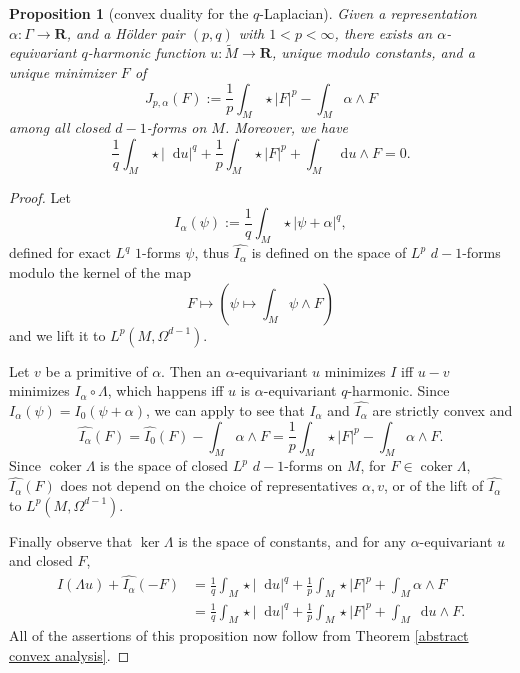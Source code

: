 \documentclass[reqno,11pt]{amsart}
\newcommand{\RR}{\mathbf{R}}
\newcommand*\dif{\mathop{}\!\mathrm{d}}
\DeclareMathOperator{\coker}{coker}
\newtheorem{proposition}[theorem]{Proposition}
\theoremstyle{definition}
\numberwithin{equation}{section}
\begin{document}
\begin{proposition}[convex duality for the $q$-Laplacian]\label{mfmc qLaplacian}
Given a representation $\alpha: \Gamma \to \RR$, and a H\"older pair $(p, q)$ with $1 < p < \infty$, there exists an $\alpha$-equivariant $q$-harmonic function $u: \tilde M \to \RR$, unique modulo constants, and a unique minimizer $F$ of 
$$J_{p, \alpha}(F) := \frac{1}{p} \int_M \star |F|^p - \int_M \alpha \wedge F$$
among all closed $d - 1$-forms on $M$.
Moreover, we have
\begin{equation}\label{strong duality}
	\frac{1}{q} \int_M \star |\dif u|^q + \frac{1}{p} \int_M \star |F|^p + \int_M \dif u \wedge F = 0.
\end{equation}
\end{proposition}
\begin{proof}
Let
$$I_\alpha(\psi) := \frac{1}{q} \int_M \star |\psi + \alpha|^q,$$
defined for exact $L^q$ $1$-forms $\psi$, thus $\widehat{I_\alpha}$ is defined on the space of $L^p$ $d - 1$-forms modulo the kernel of the map
$$F \mapsto \left(\psi \mapsto \int_M \psi \wedge F\right)$$
and we lift it to $L^p(M, \Omega^{d - 1})$.

Let $v$ be a primitive of $\alpha$.
Then an $\alpha$-equivariant $u$ minimizes $I$ iff $u - v$ minimizes $I_\alpha \circ \Lambda$, which happens iff $u$ is $\alpha$-equivariant $q$-harmonic.
Since $I_\alpha(\psi) = I_0(\psi + \alpha)$, we can apply \cite[Chapter I, Remark 4.1]{Ekeland99} to see that $I_\alpha$ and $\widehat{I_\alpha}$ are strictly convex and
$$\widehat{I_\alpha}(F) = \widehat{I_0}(F) - \int_M \alpha \wedge F = \frac{1}{p} \int_M \star |F|^p - \int_M \alpha \wedge F.$$
Since $\coker \Lambda$ is the space of closed $L^p$ $d - 1$-forms on $M$, for $F \in \coker \Lambda$, $\widehat{I_\alpha}(F)$ does not depend on the choice of representatives $\alpha, v$, or of the lift of $\widehat{I_\alpha}$ to $L^p(M, \Omega^{d - 1})$.

Finally observe that $\ker \Lambda$ is the space of constants, and for any $\alpha$-equivariant $u$ and closed $F$,
\begin{align*}
I(\Lambda u) + \widehat{I_\alpha}(-F)
&= \frac{1}{q} \int_M \star |\dif u|^q + \frac{1}{p} \int_M \star |F|^p + \int_M \alpha \wedge F \\
&= \frac{1}{q} \int_M \star |\dif u|^q + \frac{1}{p} \int_M \star |F|^p + \int_M \dif u \wedge F.
\end{align*}
All of the assertions of this proposition now follow from Theorem \ref{abstract convex analysis}.
\end{proof}
\end{document}
